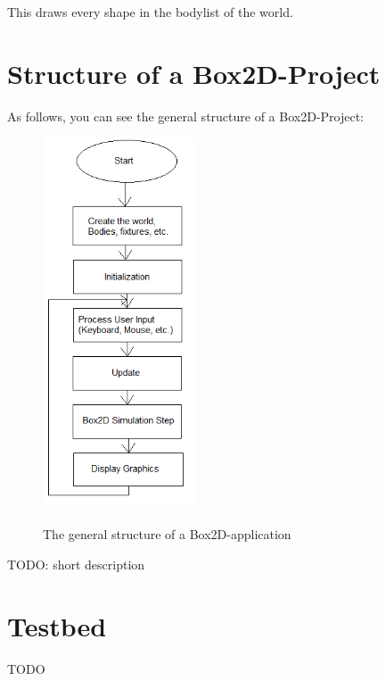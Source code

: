 \documentclass[10pt,a4paper,DIV=11]{scrreprt}
\begin{document}
This draws every shape in the bodylist of the world.
 \newpage
\section{Structure of a Box2D-Project}
As follows, you can see the general structure of a Box2D-Project: \\

\begin{center}
	\begin{figure}[H]
		\centering
		\includegraphics[width=0.4\textwidth,scale=0.5]{files/Box2D-Structure.png}
		\caption{The general structure of a Box2D-application} \cite{box2d-structure}
		\label{fig:box2d-structure}
	\end{figure}
\end{center}

TODO: short description



\section{Testbed}

TODO

\end{document}
